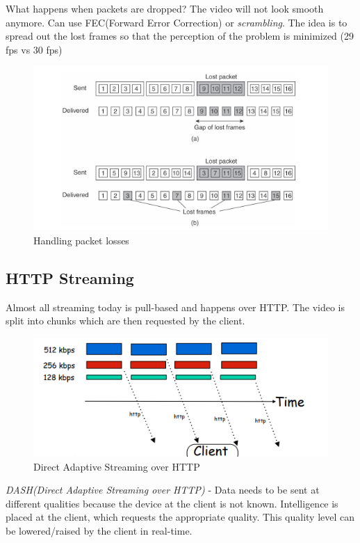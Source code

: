 \documentclass[twoside]{article}
\begin{document}
What happens when packets are dropped? The video will not look smooth anymore.
Can use FEC(Forward Error Correction) or \textit{scrambling}. The idea is to spread out the lost frames so that the perception of the problem is minimized (29 fps vs 30 fps)
\begin{figure}[t]
\includegraphics[scale=0.5]{playback2.png}
\centering
\caption{Handling packet losses}
\end{figure}


\subsection{HTTP Streaming}

Almost all streaming today is pull-based and happens over HTTP. The video is split into chunks which are then requested by the client. \\
\begin{figure}[t]
\includegraphics[scale=0.5]{dash.png}
\centering
\caption{Direct Adaptive Streaming over HTTP}
\end{figure}
\textit{DASH(Direct Adaptive Streaming over HTTP)} - Data needs to be sent at different qualities because the device at the client is not known. Intelligence is placed at the client, which requests the appropriate quality. This quality level can be lowered/raised by the client in real-time.  
\end{document}

